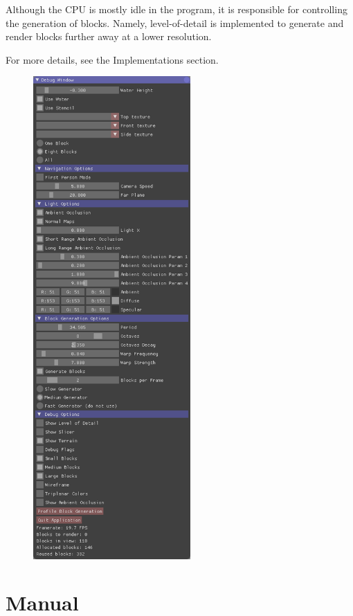 \documentclass {article}
\begin{document}
\vspace{5mm}

Although the CPU is mostly idle in the program, it is responsible for controlling the generation of blocks. Namely, level-of-detail is implemented to generate and render blocks further away at a lower resolution.

For more details, see the Implementations section.

\begin{figure}
    \includegraphics[width=6cm]{uipanel.png}
\end{figure}

\section{Manual}
\end{document}
